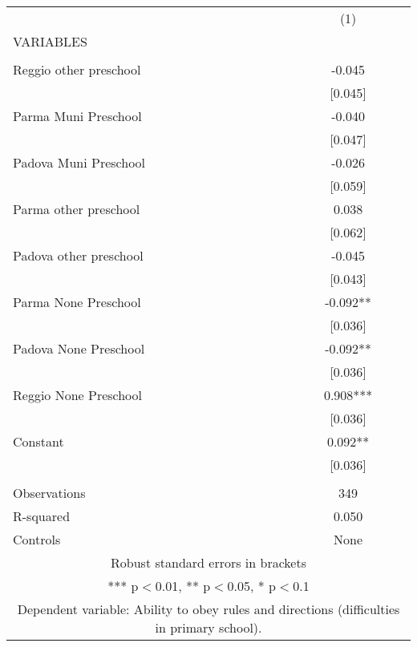\begin{tabular}{lc} \hline
 & (1) \\
VARIABLES &  \\ \hline
 &  \\
Reggio other preschool & -0.045 \\
 & [0.045] \\
Parma Muni Preschool & -0.040 \\
 & [0.047] \\
Padova Muni Preschool & -0.026 \\
 & [0.059] \\
Parma other preschool & 0.038 \\
 & [0.062] \\
Padova other preschool & -0.045 \\
 & [0.043] \\
Parma None Preschool & -0.092** \\
 & [0.036] \\
Padova None Preschool & -0.092** \\
 & [0.036] \\
Reggio None Preschool & 0.908*** \\
 & [0.036] \\
Constant & 0.092** \\
 & [0.036] \\
 &  \\
Observations & 349 \\
R-squared & 0.050 \\
 Controls & None \\ \hline
\multicolumn{2}{c}{ Robust standard errors in brackets} \\
\multicolumn{2}{c}{ *** p$<$0.01, ** p$<$0.05, * p$<$0.1} \\
\multicolumn{2}{c}{ Dependent variable: Ability to obey rules and directions (difficulties in primary school).} \\
\end{tabular}
